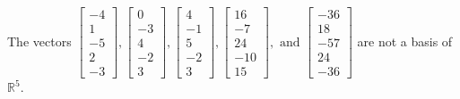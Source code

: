 \begin{exercise}
\begin{exerciseStatement}
  \end{exerciseStatement}
  \begin{exerciseAnswer}
   The vectors \(\left[\begin{array}{r}
-4 \\
1 \\
-5 \\
2 \\
-3
\end{array}\right] , \left[\begin{array}{r}
0 \\
-3 \\
4 \\
-2 \\
3
\end{array}\right] , \left[\begin{array}{r}
4 \\
-1 \\
5 \\
-2 \\
3
\end{array}\right] , \left[\begin{array}{r}
16 \\
-7 \\
24 \\
-10 \\
15
\end{array}\right] , \text{ and } \left[\begin{array}{r}
-36 \\
18 \\
-57 \\
24 \\
-36
\end{array}\right]\) 
  	 are not  a basis of \(\mathbb{R}^5\).
  


  \end{exerciseAnswer}
\end{exercise}